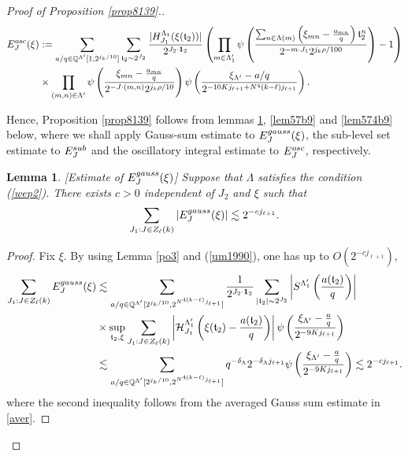 \documentclass[10pt,a4paper]{amsart}
\newtheorem{lemma}{Lemma}\numberwithin{lemma}{section}
\numberwithin{equation}{section}
\begin{document}
\begin{proof}[Proof of Proposition \ref{prop8139}.]
\begin{align*}
		E^{\rm{osc}}_J(\xi)&:=   \sum_{ a/q\in \mathbb{Q}^{\Lambda'}[1,2^{j_k/10}]}  \sum_{\mathfrak{t}_2\sim  2^{J_2}}    \frac{|H^{\Lambda_{1}}_{J_1}(\xi(\mathfrak{t}_2))|}{2^{J_2\cdot {\bf 1}_2}} \left(  \prod_{m\in\Lambda'_{1}}\psi\left( \frac{\sum_{n\in\Lambda(m)}\left( \xi_{mn}-\frac{a_{mn}}{q} \right)\mathfrak{t}_2^n }{2^{-m\cdot J_1} 2^{ j_k\rho/100}} \right) -1\right)\nonumber\\
	&\times \prod_{(m,n)\in \Lambda'} \psi\left(  \frac{  \xi_{mn}-\frac{a_{mn}}{q}}{ 2^{-J\cdot (m,n)}2^{j_k\rho/10}} \right)\psi\left(\frac{\xi_{\Lambda'}-a/q}{2^{-10Kj_{\ell+1}+N^4(k-\ell)j_{\ell+1} }}\right).
\end{align*}



Hence, Proposition \ref{prop8139} follows from  lemmas \ref{lem859}, \ref{lem57b9} and \ref{lem574b9} below, where we shall apply Gauss-sum estimate to $E^{\rm{gauss}}_J(\xi)$,  the sub-level set estimate to $E^{\rm{sub}}_J$ and the oscillatory integral estimate to $E^{\rm{osc}}_J$,   respectively.



 \begin{lemma}\label{lem859}[Estimate of $E^{\rm{gauss}}_J(\xi)$]
 Suppose that $\Lambda$ satisfies   the  condition (\ref{wep2}). There exists $c>0$ independent of $J_2$ and $\xi$ such that 
$$\sum_{J_1:J\in Z_{\ell}(k)} |E^{\rm{gauss}}_J(\xi)|\lesssim 2^{-cj_{\ell+1}}.$$
\end{lemma}
\begin{proof} 
Fix $\xi$. By using Lemma \ref{po3} and (\ref{um1990}),  one has up to $O(2^{-cj_{\ell+1}})$,
  \begin{align*}
\sum_{J_1:J\in Z_{\ell}(k)} E^{\rm{gauss}}_J(\xi)
&\lesssim \sum_{a/q\in  \mathbb{Q}^{\Lambda'}[2^{j_k/10}, 2^{N^{4(k-\ell)}j_{\ell+1} }] } \frac{1}{2^{J_2\cdot {\bf 1}_2}}\sum_{|\mathfrak{t}_2|\sim 2^{J_2}}\left|S^{\Lambda_{1}'}\left( \frac{a(\mathfrak{t}_2)}{q} \right)\right| \\
 &\times\sup_{\mathfrak{t}_2,\xi} \sum_{J_1:J\in Z_\ell(k)}\left|\mathcal{H}^{\Lambda_{1}'}_{J_1}\left( \xi(\mathfrak{t}_2)-\frac{a(\mathfrak{t}_2)}{q}  \right)\right|\psi\left(\frac{\xi_{\Lambda'}-\frac{a}{q}}{2^{-9Kj_{\ell+1}}}\right)\\
&\lesssim \sum_{a/q\in  \mathbb{Q}^{\Lambda'}[2^{j_k/10},2^{N^{4(k-\ell)}j_{\ell+1}} ]}  q^{-\delta_{\Lambda}}2^{-\delta_{\Lambda}j_{\ell+1}}\psi\left(\frac{\xi_{\Lambda'}-\frac{a}{q}}{2^{-9 Kj_{\ell+1}}}\right)  \lesssim   2^{-cj_{\ell+1}}.
 \end{align*}  
where the second inequality follows from the averaged Gauss sum estimate in \eqref{aver}. 
\end{proof} 





\end{proof}
\end{document}
